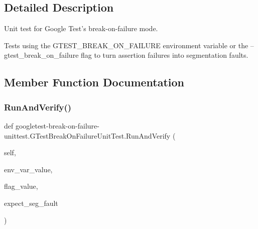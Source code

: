 \subsection{Detailed Description}
\begin{DoxyVerb}Unit test for Google Test's break-on-failure mode.

Tests using the GTEST_BREAK_ON_FAILURE environment variable or
the --gtest_break_on_failure flag to turn assertion failures into
segmentation faults.
\end{DoxyVerb}
 

\subsection{Member Function Documentation}
\mbox{\label{classgoogletest-break-on-failure-unittest_1_1GTestBreakOnFailureUnitTest_a04676ed51e337fa6be3f99a73a87040d}} 
\subsubsection{\texorpdfstring{Run\+And\+Verify()}{RunAndVerify()}}
{\footnotesize\ttfamily def googletest-\/break-\/on-\/failure-\/unittest.\+G\+Test\+Break\+On\+Failure\+Unit\+Test.\+Run\+And\+Verify (\begin{DoxyParamCaption}\item[{}]{self,  }\item[{}]{env\+\_\+var\+\_\+value,  }\item[{}]{flag\+\_\+value,  }\item[{}]{expect\+\_\+seg\+\_\+fault }\end{DoxyParamCaption})}

